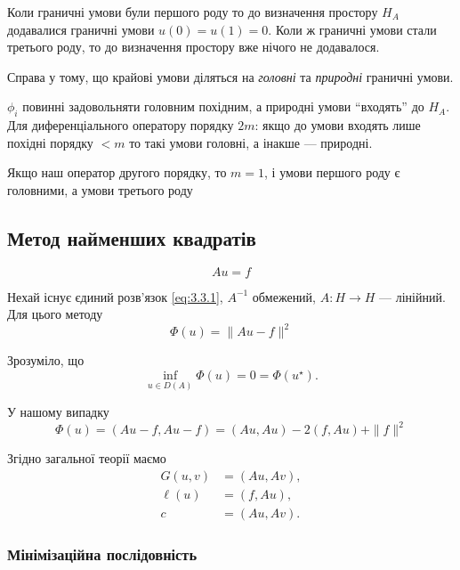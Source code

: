 Коли граничні умови були першого роду то до визначення простору $H_A$ додавалися граничні умови $u(0) = u(1) = 0$.
Коли ж граничні умови стали третього роду, то до визначення простору вже нічого не додавалося. 

\begin{remark}
    Справа у тому, що крайові умови діляться на \textit{головні} та \textit{природні} граничні умови.
\end{remark}

$\phi_i$ повинні задовольняти головним похідним, а природні умови ``входять'' до $H_A$.
Для диференціального оператору порядку $2 m$: 
якщо до умови входять лише похідні порядку $< m$ то такі умови головні, а інакше --- природні. 

\begin{example}
    Якщо наш оператор другого порядку, то $m = 1$, і умови першого роду є головними, а умови третього роду
\end{example}

\subsection{Метод найменших квадратів}

\begin{equation}
    \label{eq:3.3.1}
    A u = f
\end{equation}

Нехай існує єдиний розв'язок \eqref{eq:3.3.1}, $A^{-1}$ обмежений, $A: H \to H$ --- лінійний. Для цього методу
\begin{equation}
    \label{eq:3.3.2}
    \Phi(u) = \|A u - f\|^2
\end{equation}

Зрозуміло, що
\begin{equation*}
    \inf_{u \in D(A)} \Phi(u) = 0 = \Phi(u^\star).
\end{equation*}

У нашому випадку
\begin{equation}
    \label{eq:3.3.3}
    \Phi(u) = (A u - f, A u - f) = (A u, A u) - 2 (f, A u) + \|f\|^2
\end{equation}

Згідно загальної теорії маємо 
\begin{align*}
    G(u, v) &= (A u, A v), \\
    \ell(u) &= (f, A u), \\
    c &= (A u, A v).
\end{align*}

\subsubsection{Мінімізаційна послідовність}

